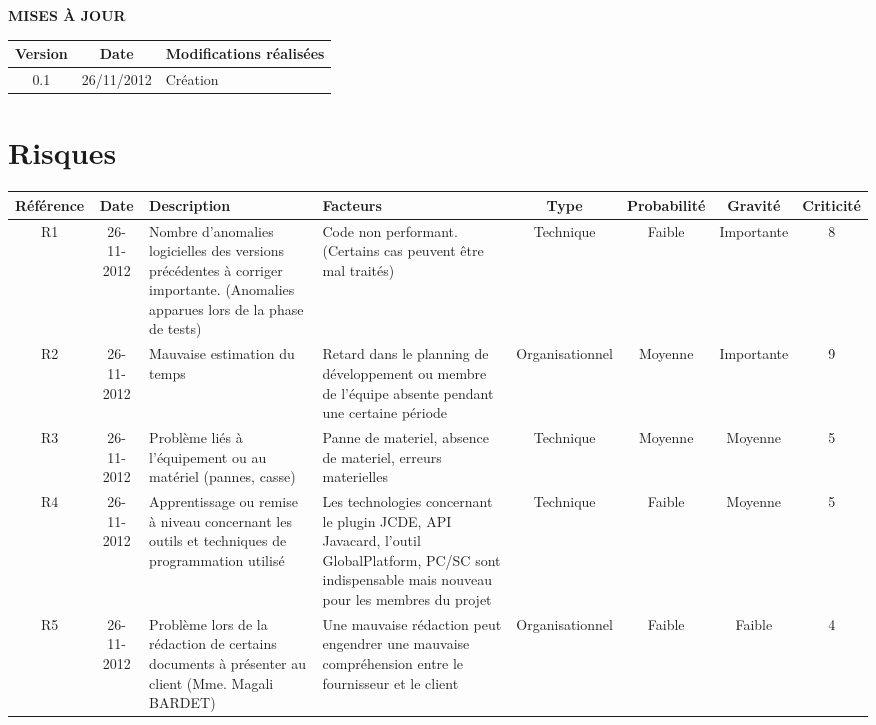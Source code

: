 \documentclass[a4paper,11pt,french]{article}
\begin{document}
\makeFirstPage
\clearpage
\vspace*{1cm}
\begin{center}
\textbf{\huge{MISES À JOUR}}\\
\vspace*{3cm}
	\begin{tabularx}{16cm}{|c|c|X|}
	\hline
	\bfseries{Version} & \bfseries{Date} & \bfseries{Modifications
réalisées}\\
	\hline
	0.1 & 26/11/2012 & Création\\
	\hline
	\end{tabularx}
\end{center}

\clearpage

\section{Risques}
\begin{flushleft}
\begin{small} 
\begin{tabularx}{18cm}{|c|c|p{2.28cm}|p{2cm}|c|c|c|c|}
\hline
\cellcolor[gray]{.7} Référence & \cellcolor[gray]{.7} Date & \cellcolor[gray]{.7}Description & \cellcolor[gray]{.7}Facteurs & \cellcolor[gray]{.7}Type & \cellcolor[gray]{.7}Probabilité & \cellcolor[gray]{.7}Gravité &
\cellcolor[gray]{.7}Criticité\\
\hline
R1 & 26-11-2012 & 
Nombre d'anomalies logicielles des versions précédentes
à corriger importante. (Anomalies apparues lors de la phase de tests)
& Code non performant. (Certains cas peuvent être mal traités)
& Technique & Faible & Importante & 8 \\
\hline
R2 & 26-11-2012 &
Mauvaise estimation du temps
& Retard dans le planning de
développement ou membre de l’équipe absente pendant une certaine période
& Organisationnel & Moyenne & Importante & 9 \\
\hline
R3 & 26-11-2012 &
Problème liés à l’équipement ou au matériel (pannes, casse)
& 
Panne de materiel, absence de materiel, erreurs materielles 
& Technique & Moyenne & Moyenne & 5 \\
\hline
R4 & 26-11-2012 & 
Apprentissage ou remise à niveau concernant les outils et techniques de
programmation utilisé
& Les technologies concernant le plugin JCDE, API Javacard, l'outil 
GlobalPlatform, PC/SC sont indispensable mais nouveau pour les membres du
projet
& Technique & Faible & Moyenne & 5 \\
\hline
R5 & 26-11-2012 & Problème lors de la rédaction de certains documents à
présenter au client (Mme. Magali BARDET)
& Une mauvaise rédaction peut engendrer une mauvaise compréhension entre le
fournisseur et le client
& Organisationnel & Faible & Faible & 4 \\
\hline
\end{tabularx}

\end{small}
\end{flushleft}
\end{document}
